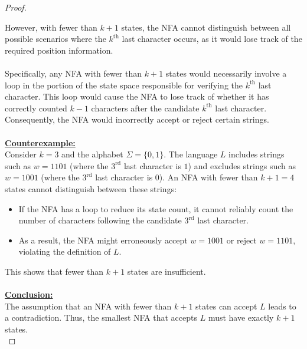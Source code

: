 \documentclass[12pt]{article}
\begin{document}
\begin{proof}
\begin{itemize}
    \end{itemize}
    However, with fewer than $k + 1$ states, the NFA cannot distinguish between all possible scenarios where the $k^\text{th}$ last character occurs, as it would lose track of the required position information. \\
    \\
    Specifically, any NFA with fewer than $k + 1$ states would necessarily involve a loop in the portion of the state space responsible for verifying the $k^\text{th}$ last character. This loop would cause the NFA to lose track of whether it has correctly counted $k - 1$ characters after the candidate $k^\text{th}$ last character. Consequently, the NFA would incorrectly accept or reject certain strings. \\
    \\
    \underline{\textbf{Counterexample:}} \\
    Consider $k = 3$ and the alphabet $\Sigma = \{0, 1\}$. The language $L$ includes strings such as $w = 1101$ (where the $3^\text{rd}$ last character is $1$) and excludes strings such as $w = 1001$ (where the $3^\text{rd}$ last character is $0$). An NFA with fewer than $k + 1 = 4$ states cannot distinguish between these strings:
    \begin{itemize}
        \item If the NFA has a loop to reduce its state count, it cannot reliably count the number of characters following the candidate $3^\text{rd}$ last character.
        \item As a result, the NFA might erroneously accept $w = 1001$ or reject $w = 1101$, violating the definition of $L$.
    \end{itemize}
    This shows that fewer than $k + 1$ states are insufficient. \\
    \\
    \underline{\textbf{Conclusion:}} \\
    The assumption that an NFA with fewer than $k + 1$ states can accept $L$ leads to a contradiction. Thus, the smallest NFA that accepts $L$ must have exactly $k + 1$ states. \\
\end{proof}
\leavevmode\\
\pagebreak
\end{document}
